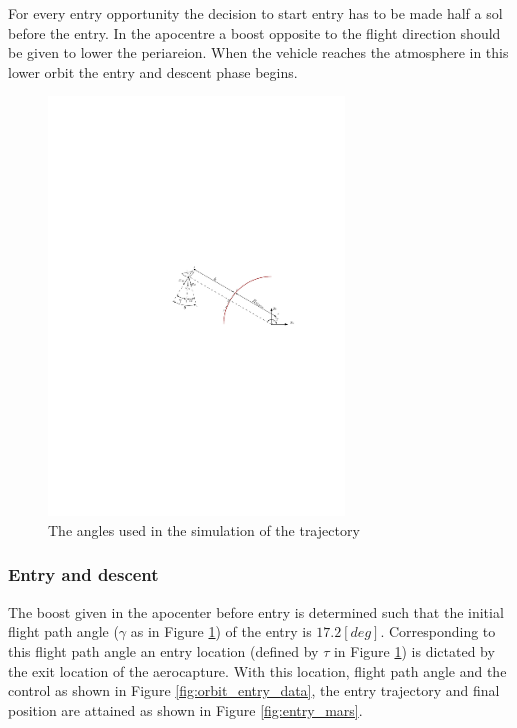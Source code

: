 For every entry opportunity the decision to start entry has to be made half a sol before the entry. In the apocentre a boost opposite to the flight direction should be given to lower the periareion.  When the vehicle reaches the atmosphere in this lower orbit the entry and descent phase begins.

\begin{figure}[h]
	\centering
	\includegraphics[width=0.7\textwidth]{Figure/Orbit/angles.pdf}
	\caption{The angles used in the simulation of the trajectory}
	\label{fig:angles}
\end{figure}

\subsubsection{Entry and descent}\label{sec:entry_descent}
The boost given in the apocenter before entry is determined such that the initial flight path angle ($\gamma$ as in Figure \ref{fig:angles}) of the entry is $17.2 \left[deg\right]$. Corresponding to this flight path angle an entry location (defined by $\tau$ in Figure \ref{fig:angles}) is dictated by the exit location of the aerocapture. With this location, flight path angle and the control as shown in Figure \ref{fig:orbit_entry_data}, the entry trajectory and final position are attained as shown in Figure \ref{fig:entry_mars}.

